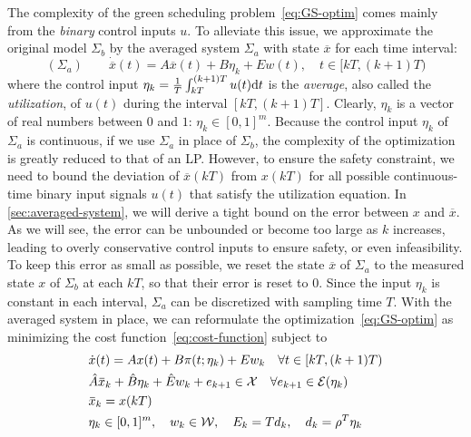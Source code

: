 The complexity of the green scheduling problem~\eqref{eq:GS-optim} comes mainly from the \emph{binary} control inputs $u$.
To alleviate this issue, we %
approximate the original model $\Sigma_b$ by %
the averaged system $\Sigma_a$ with state $\overbar{x}$ for each time interval:
\begin{equation*}
(\Sigma_a) \qquad \dot{\overbar{x}} (t) = A \overbar{x} (t) + B \eta_k + Ew (t), \quad t \in [kT, (k + 1) T)
 \end{equation*}
where the control input $\eta_k = \frac{1}{T} \int_{kT}^{(k + 1) T} u (t) \mathrm{d} t$ is the \emph{average}, also called the \emph{utilization}, of $u (t)$ during the interval $[kT, (k + 1) T]$.
Clearly, $\eta_k$ is a vector of real numbers between $0$ and $1$: $\eta_k \in [0, 1]^m$.
Because the control input $\eta_k$ of $\Sigma_a$ is continuous, if we use $\Sigma_a$ in place of $\Sigma_b$, the complexity of the optimization is greatly reduced to that of an LP.
However, to ensure the safety constraint, we need to bound the deviation of $\overbar{x} (kT)$ from $x (kT)$ for all possible continuous-time binary input signals $u (t)$ that satisfy the utilization equation.
In \cref{sec:averaged-system}, we will derive a tight bound on the error between $x$ and $\overbar{x}$.
As we will see, the error can be unbounded or become too large as $k$ increases, leading to overly conservative control inputs to ensure safety, or even infeasibility.
To keep this error as small as possible, we reset the state $\overbar{x}$ of $\Sigma_a$ to the measured state $x$ of $\Sigma_b$ at each $kT$, so that their error is reset to $0$.
Since the input $\eta_k$ is constant in each interval, $\Sigma_a$ can be discretized with sampling time $T$.
With the averaged system in place, we can reformulate the optimization~\eqref{eq:GS-optim} as minimizing the cost function~\eqref{eq:cost-function} subject to
\begin{subequations}
  \label{eq:averaged-optim}
  \begin{align}
    & \dot{x} (t) = Ax (t) + B \pi (t ; \eta_k) + Ew_{k} \quad \forall t \in [kT, (k + 1) T) %
\label{eq:averaged-optim:cont}\\
    & \hat{A}  \overbar{x}_{k} + \hat{B} \eta_k + \hat{E} w_{k} + e_{k+1} \in \XSet \quad \forall e_{k+1} \in \ESet (\eta_{k}) \label{eq:averaged-optim:safety}\\
    & \overbar{x}_{k} = x (kT) \label{eq:averaged-optim:reset}\\
    & \eta_{k} \in [0,1]^{m}, \quad w_{k} \in \WSet, \quad E_k = Td_k, \quad d_k = \rho^T \eta_k
  \end{align}
\end{subequations}
